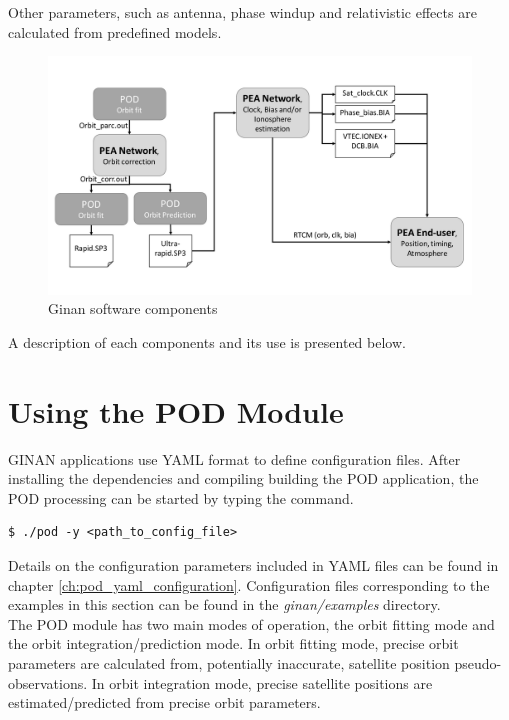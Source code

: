 Other parameters, such as antenna, phase windup and relativistic effects are calculated from predefined models.

\begin{figure}
	\centering
	\includegraphics[width=\linewidth]{Figures/Ginan_diagram.pdf}
	\caption{Ginan software components}
	\label{fig:PEAnPOD}
\end{figure}

A description of each components and its use is presented below.\\

\chapter{Using the POD Module}
GINAN applications use YAML format to define configuration files. After installing the dependencies and compiling building the POD application, the POD processing can be started by typing the command.
\begin{verbatim}
$ ./pod -y <path_to_config_file>
\end{verbatim}
Details on the configuration parameters included in YAML files can be found in chapter \ref{ch:pod_yaml_configuration}. Configuration files corresponding to the examples in this section can be found in the \textit{ginan/examples} directory.\\

The POD module has two main modes of operation, the orbit fitting mode and the orbit integration/prediction mode. In orbit fitting mode, precise orbit parameters are calculated from, potentially inaccurate, satellite position pseudo-observations. In orbit integration mode, precise satellite positions are estimated/predicted from precise orbit parameters.\\

